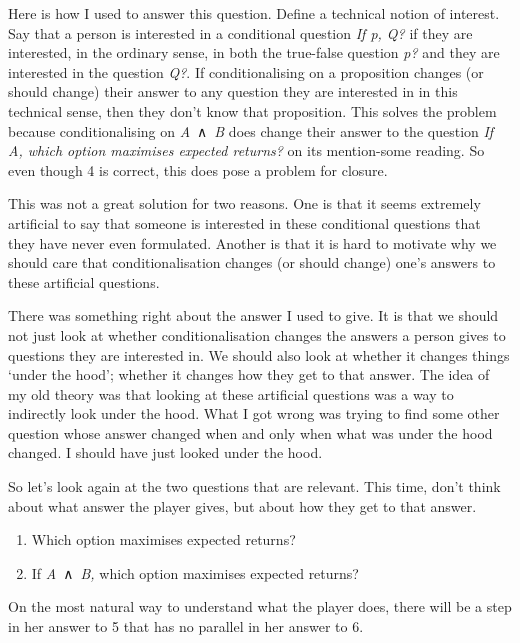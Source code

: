 \documentclass[
  10pt,
  letterpaper,
  twoside]{scrbook}
\providecommand{\tightlist}{%
  \setlength{\itemsep}{0pt}\setlength{\parskip}{0pt}}\usepackage{longtable,booktabs,array}
\begin{document}
Here is how I used to answer this question. Define a technical notion of
interest. Say that a person is interested in a conditional question
\emph{If p, Q?} if they are interested, in the ordinary sense, in both
the true-false question \emph{p?} and they are interested in the
question \emph{Q?}. If conditionalising on a proposition changes (or
should change) their answer to any question they are interested in in
this technical sense, then they don't know that proposition. This solves
the problem because conditionalising on \emph{A}~∧~\emph{B} does change
their answer to the question \emph{If A, which option maximises expected
returns?} on its mention-some reading. So even though 4 is correct, this
does pose a problem for closure.

This was not a great solution for two reasons. One is that it seems
extremely artificial to say that someone is interested in these
conditional questions that they have never even formulated. Another is
that it is hard to motivate why we should care that conditionalisation
changes (or should change) one's answers to these artificial questions.

There was something right about the answer I used to give. It is that we
should not just look at whether conditionalisation changes the answers a
person gives to questions they are interested in. We should also look at
whether it changes things `under the hood'; whether it changes how they
get to that answer. The idea of my old theory was that looking at these
artificial questions was a way to indirectly look under the hood. What I
got wrong was trying to find some other question whose answer changed
when and only when what was under the hood changed. I should have just
looked under the hood.

So let's look again at the two questions that are relevant. This time,
don't think about what answer the player gives, but about how they get
to that answer.

\begin{enumerate}
\def\labelenumi{\arabic{enumi}.}
\setcounter{enumi}{4}
\tightlist
\item
  Which option maximises expected returns?
\item
  If \emph{A}~∧~\emph{B,} which option maximises expected returns?
\end{enumerate}

On the most natural way to understand what the player does, there will
be a step in her answer to 5 that has no parallel in her answer to 6.
\end{document}
